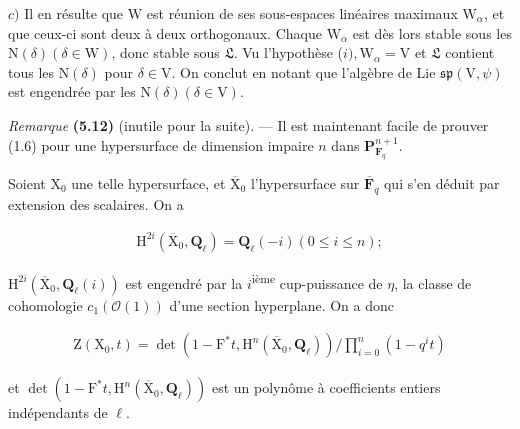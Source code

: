 \documentclass[10pt,leqno]{article}
\begin{document}
\clearpage

\label{physical-23}

\noindent \(c)\) Il en résulte que \(\mathrm{W}\) est réunion de ses sous-espaces linéaires maximaux \(\mathrm{W}_{\alpha }\), et que ceux-ci sont deux à deux orthogonaux. Chaque \(\mathrm{W}_{\alpha }\) est dès lors stable sous les \(\mathrm{N}(\delta ) (\delta \in \mathrm{W})\), donc stable sous \(\mathfrak{L} \). Vu l’hypothèse (\(i), \mathrm{W}_{\alpha }=\mathrm{V}\) et \(\mathfrak{L} \) contient tous les \(\mathrm{N}(\delta )\) pour \(\delta \in \mathrm{V}\). On conclut en notant que l’algèbre de Lie \(\mathfrak{sp}(\mathrm{V},\psi )\) est engendrée par les \(\mathrm{N}(\delta ) (\delta \in \mathrm{V})\).\par

\noindent \emph{Remarque} \textbf{(5.12)} (inutile pour la suite). — Il est maintenant facile de prouver (1.6) pour une hypersurface de dimension impaire \(n\) dans \(\mathbf{P}^{n+1}_{\mathbf{F}_{q}}\).\par

\noindent Soient \(\mathrm{X}_{0}\) une telle hypersurface, et \(\overline{\mathrm{X}}_{0}\) l’hypersurface sur \(\overline{\mathbf{F}}_{q}\) qui s’en déduit par extension des scalaires. On a\par

\begin{equation*}\begin{gathered}\mathrm{H}^{2i}(\overline{\mathrm{X}}_{0},\mathbf{Q}_{\ell })=\mathbf{Q}_{\ell }(- i)    (0\leq i\leq n);\end{gathered}\end{equation*}

\noindent \(\mathrm{H}^{2i}(\overline{\mathrm{X}}_{0},\mathbf{Q}_{\ell }(i))\) est engendré par la \(i\)\textsuperscript{ième} cup-puissance de \(\eta \), la classe de cohomologie \(c_{1}(\mathcal{O}(1))\) d’une section hyperplane. On a donc\par

\begin{equation*}\begin{gathered}\mathrm{Z}(\mathrm{X}_{0},t)=\operatorname{det}(1- \mathrm{F}^{*}t,\mathrm{H}^{n}(\overline{\mathrm{X}}_{0},\mathbf{Q}_{\ell })) / \prod _{i=0}^{n}(1- q^{i} t)\end{gathered}\end{equation*}

\noindent et \(\operatorname{det}(1- \mathrm{F}^{*}t,\mathrm{H}^{n}(\overline{\mathrm{X}}_{0},\mathbf{Q}_{\ell }))\) est un polynôme à coefficients entiers indépendants de \(\ell \).\par
\end{document}
